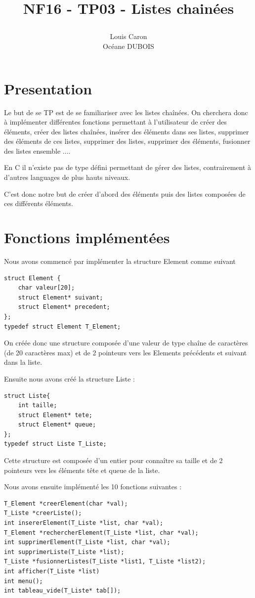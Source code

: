 \documentclass[11pt]{report}
\title{\textbf{NF16 - TP03 - Listes chainées}
\author{Louis Caron \\ Océane DUBOIS\\}
\date{}}
\begin{document}
\maketitle

\newpage

\section{Presentation}

Le but de se TP est de se familiariser avec les listes chaînées. On cherchera donc à implémenter différentes fonctions permettant à l'utilisateur de créer des éléments, créer des listes chaînées, insérer des éléments dans ses listes, supprimer des éléments de ces listes, supprimer des listes, supprimer des éléments, fusionner des listes ensemble .... 

En C il n'existe pas de type défini permettant de gérer des listes, contrairement à d'autres languages de plus hauts niveaux. 

C'est donc notre but de créer d'abord des éléments puis des listes composées de ces différents éléments.

\section{Fonctions implémentées}

Nous avons commencé par implémenter la structure Element comme suivant 

\begin{lstlisting}
struct Element {
	char valeur[20];
	struct Element* suivant;
	struct Element* precedent;
};
typedef struct Element T_Element;
\end{lstlisting}
On créée donc une structure composée d'une valeur de type chaîne de caractères (de 20 caractères max) et de 2 pointeurs vers les Elements précédents et suivant dans la liste.

Ensuite nous avons créé la structure Liste :

\begin{lstlisting}
struct Liste{
	int taille;
	struct Element* tete;
	struct Element* queue;
};
typedef struct Liste T_Liste;

\end{lstlisting}

Cette structure est composée d'un entier pour connaître sa taille et de 2 pointeurs vers les éléments tête et queue de la liste. 

Nous avons ensuite implémenté les 10 fonctions suivantes : 
\begin{lstlisting}
T_Element *creerElement(char *val);
T_Liste *creerListe();
int insererElement(T_Liste *list, char *val);
T_Element *rechercherElement(T_Liste *list, char *val);
int supprimerElement(T_Liste *list, char *val);
int supprimerListe(T_Liste *list);
T_Liste *fusionnerListes(T_Liste *list1, T_Liste *list2);
int afficher(T_Liste *list)
int menu();
int tableau_vide(T_Liste* tab[]); 
 \end{lstlisting}
\end{document}
